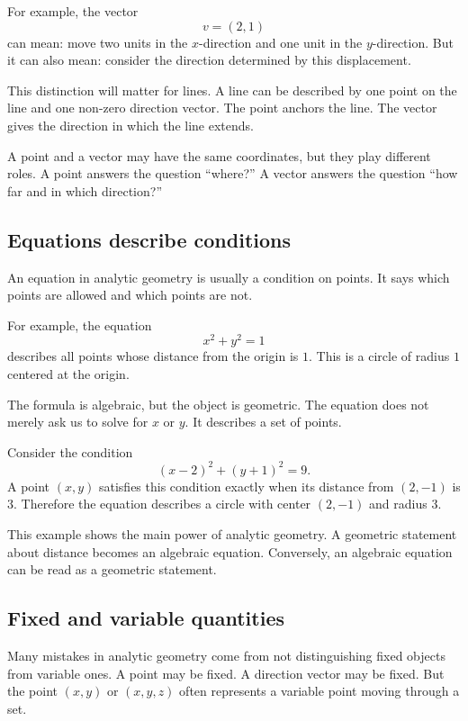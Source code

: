 For example, the vector
\[
v=(2,1)
\]
can mean: move two units in the \(x\)-direction and one unit in the \(y\)-direction. But it can also mean: consider the direction determined by this displacement.

This distinction will matter for lines. A line can be described by one point on the line and one non-zero direction vector. The point anchors the line. The vector gives the direction in which the line extends.

\begin{remarkbox}
A point and a vector may have the same coordinates, but they play different roles. A point answers the question ``where?'' A vector answers the question ``how far and in which direction?''
\end{remarkbox}

\subsection*{Equations describe conditions}

An equation in analytic geometry is usually a condition on points. It says which points are allowed and which points are not.

For example, the equation
\[
x^2+y^2=1
\]
describes all points whose distance from the origin is \(1\). This is a circle of radius \(1\) centered at the origin.

The formula is algebraic, but the object is geometric. The equation does not merely ask us to solve for \(x\) or \(y\). It describes a set of points.

\begin{examplebox}
Consider the condition
\[
(x-2)^2+(y+1)^2=9.
\]
A point \((x,y)\) satisfies this condition exactly when its distance from \((2,-1)\) is \(3\). Therefore the equation describes a circle with center \((2,-1)\) and radius \(3\).
\end{examplebox}

This example shows the main power of analytic geometry. A geometric statement about distance becomes an algebraic equation. Conversely, an algebraic equation can be read as a geometric statement.

\subsection*{Fixed and variable quantities}

Many mistakes in analytic geometry come from not distinguishing fixed objects from variable ones. A point may be fixed. A direction vector may be fixed. But the point \((x,y)\) or \((x,y,z)\) often represents a variable point moving through a set.

